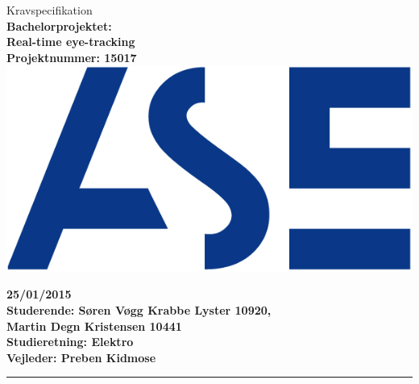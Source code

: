 \documentclass[a4paper,oneside,12pt]{article}
\begin{document}
\begin{titlepage}
\centering
\vfill
{\LARGE Kravspecifikation}\\
\vfill
{\bfseries\large
	Bachelorprojektet: \\
	Real-time eye-tracking\\
	Projektnummer: 15017\\
}
\vfill
\includegraphics{ASE_logo.png}
\vfill
{\bfseries\large
	25/01/2015\\
	Studerende: Søren Vøgg Krabbe Lyster 10920,\\
	Martin Degn Kristensen 10441\\
	Studieretning: Elektro \\
	Vejleder: Preben Kidmose \\
	\vfill	
	\rule{6cm}{1pt}
}
\vfill

\end{titlepage}
\tableofcontents






\end{document}
